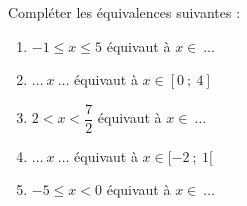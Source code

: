 \begin{exo}{}
	Compléter les équivalences suivantes :
	\begin{enumerate}[itemsep=3mm]
		\item $-1 \leq x \leq 5$ équivaut à $x \in \ \dots$
		\item $\dots \ x \ \dots$ équivaut à $x \in [0\ ;\ 4]$
		\item $2 < x < \dfrac{7}{2}$ équivaut à $x \in \ \dots$
		\item $\dots \ x \ \dots$ équivaut à $x \in [-2\ ;\ 1[$
		\item $-5 \leq x < 0$ équivaut à $x \in \ \dots$
	\end{enumerate}
\end{exo}
